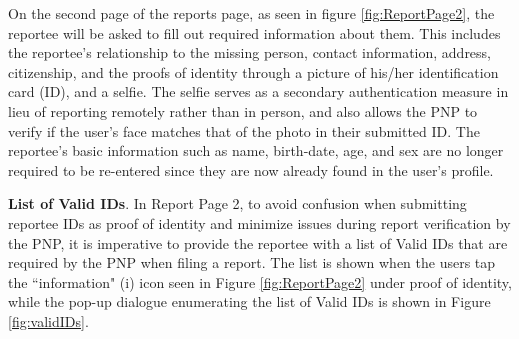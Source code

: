 On the second page of the reports page, as seen in figure \ref{fig:ReportPage2}, the reportee will be asked to fill out required information about them. This includes the reportee's relationship to the missing person, contact information, address, citizenship, and the proofs of identity through a picture of his/her identification card (ID), and a selfie. The selfie serves as a secondary authentication measure in lieu of reporting remotely rather than in person, and also allows the PNP to verify if the user's face matches that of the photo in their submitted ID. The reportee's basic information such as name, birth-date, age, and sex are no longer required to be re-entered since they are now already found in the user's profile. 

\textbf{List of Valid IDs}. In Report Page 2, to avoid confusion when submitting reportee IDs as proof of identity and minimize issues during report verification by the PNP, it is imperative to provide the reportee with a list of Valid IDs that are required by the PNP when filing a report. The list is shown when the users tap the ``information" (i) icon seen in Figure \ref{fig:ReportPage2} under proof of identity, while the pop-up dialogue enumerating the list of Valid IDs is shown in Figure \ref{fig:validIDs}.

